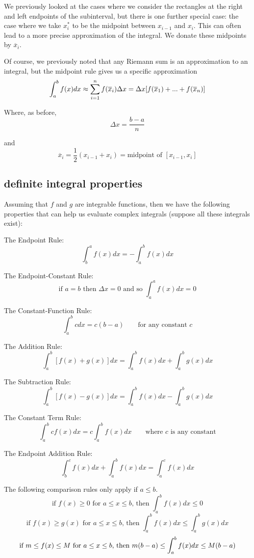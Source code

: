 \documentclass[10pt,a4paper]{report}
\begin{document}
We previously looked at the cases where we consider the rectangles at the right and left endpoints of the subinterval, but there is one further special case: the case where we take $x_i^*$ to be the midpoint between $x_{i-1}$ and $x_i$. This can often lead to a more precise approximation of the integral. We donate these midpoints by $\overline{x}_i$.

Of course, we previously noted that any Riemann sum is an approximation to an integral, but the midpoint rule gives us a specific approximation
$$
	\int_a^b f(x) dx \approx \displaystyle\sum_{i = 1}^n f(\overline{x}_i) \Delta x = \\
		\Delta x [ f(\overline{x}_1 ) + ... + f(\overline{x}_n) ]
$$

Where, as before,
$$
	\Delta x = \frac{b - a}{n}
$$

and
$$
	\overline{x}_i = \frac{1}{2} (x_{i - 1} + x_i) = \text{midpoint of } [x_{i - 1}, x_i]
$$

\pagebreak

\subsection{definite integral properties}


Assuming that $f$ and $g$ are integrable functions, then we have the following properties that can help us evaluate complex integrals (suppose all these integrals exist):

The Endpoint Rule:
$$
	\int_b^a f(x) dx = - \int_a^b f(x) dx
$$

The Endpoint-Constant Rule:
$$
	\text{if } a = b \text{ then } \Delta x = 0 \text{ and so } \int_a^a f(x) dx = 0
$$

The Constant-Function Rule:
$$
	\int_a^b c dx = c(b - a) \qquad \text{for any constant } c
$$

The Addition Rule:
$$
	\int_a^b [f(x) + g(x)] dx = \int_a^b f(x) dx + \int_a^b g(x) dx
$$

The Subtraction Rule:
$$
	\int_a^b [f(x) - g(x)] dx = \int_a^b f(x) dx - \int_a^b g(x) dx
$$

The Constant Term Rule:
$$
	\int_a^b cf(x) dx = c \int_a^b f(x)dx \qquad \text{where } c \text{ is any constant}
$$

The Endpoint Addition Rule:
$$
	\int_b^c f(x) dx + \int_a^b f(x) dx = \int_a^c f(x) dx
$$

\noindent The following comparison rules only apply if $a \leq b$.
$$
	\text{if } f(x) \geq 0 \text{ for } a \leq x \leq b \text{, then } \int_a^b f(x) dx \leq 0
$$
$$
	\text{if } f(x) \geq g(x) \text{ for } a \leq x \leq b \text{, then } \int_a^b f(x) dx \leq \int_a^b g(x) dx
$$
$$
	\text{if } m \leq f(x) \leq M \text{ for } a \leq x \leq b \text{, then } \\
	m(b - a) \leq \int_a^b f(x) dx \leq M(b - a)
$$
\end{document}
